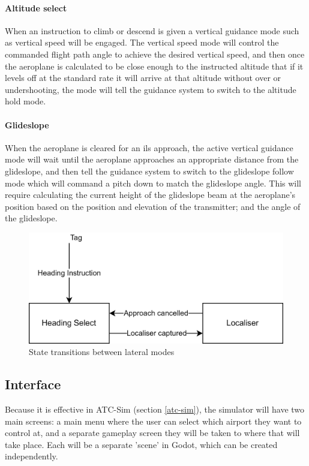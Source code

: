 \documentclass{article}
\begin{document}
\paragraph{Altitude select}
When an instruction to climb or descend is given a vertical guidance mode such as vertical speed will be engaged.
The vertical speed mode will control the commanded flight path angle to achieve the desired vertical speed, and then once the aeroplane is calculated to be close enough to the instructed altitude that if it levels off at the standard rate it will arrive at that altitude without over or undershooting, the mode will tell the guidance system to switch to the altitude hold mode.
\paragraph{Glideslope}
When the aeroplane is cleared for an \acrshort{ils} approach, the active vertical guidance mode will wait until the aeroplane approaches an appropriate distance from the glideslope, and then tell the guidance system to switch to the glideslope follow mode which will command a pitch down to match the glideslope angle.
This will require calculating the current height of the glideslope beam at the aeroplane's position based on the position and elevation of the transmitter; and the angle of the glideslope.

\begin{figure}[H]
\centering
\includegraphics{diagrams/lnav.png}
\caption{\label{fig:lnav}State transitions between lateral modes}
\end{figure}


\subsection{Interface}
Because it is effective in ATC-Sim (section \ref{atc-sim}), the simulator will have two main screens: a main menu where the user can select which airport they want to control at, and a separate gameplay screen they will be taken to where that will take place.
Each will be a separate 'scene' in Godot, which can be created independently.
\end{document}
